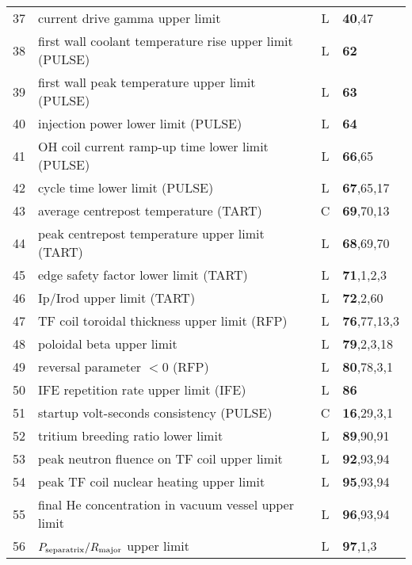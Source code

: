 \documentclass[11pt,a4paper]{report}
\begin{document}
\begin{table}[tbph]
\begin{center}
\begin{tabular}{||c|l|c|l||}
37  & current drive gamma upper limit                           & L    & \textbf{40},47 \\
38  & first wall coolant temperature rise upper limit (PULSE)   & L    & \textbf{62} \\
39  & first wall peak temperature upper limit (PULSE)           & L    & \textbf{63} \\
40  & injection power lower limit (PULSE)                       & L    & \textbf{64} \\
41  & OH coil current ramp-up time lower limit (PULSE)          & L    & \textbf{66},65 \\
42  & cycle time lower limit (PULSE)                            & L    & \textbf{67},65,17 \\
43  & average centrepost temperature (TART)                     & C    & \textbf{69},70,13 \\
44  & peak centrepost temperature upper limit (TART)            & L    & \textbf{68},69,70 \\
45  & edge safety factor lower limit    (TART)                  & L    & \textbf{71},1,2,3 \\
46  & Ip/Irod upper limit               (TART)                  & L    & \textbf{72},2,60 \\
47  & TF coil toroidal thickness upper limit (RFP)              & L    & \textbf{76},77,13,3 \\
48  & poloidal beta upper limit                                 & L    & \textbf{79},2,3,18 \\
49  & reversal parameter $< 0$ (RFP)                            & L    & \textbf{80},78,3,1 \\
50  & IFE repetition rate upper limit (IFE)                     & L    & \textbf{86} \\
51  & startup volt-seconds consistency (PULSE)                  & C    & \textbf{16},29,3,1 \\
52  & tritium breeding ratio lower limit                        & L    & \textbf{89},90,91 \\
53  & peak neutron fluence on TF coil upper limit               & L    & \textbf{92},93,94 \\
54  & peak TF coil nuclear heating upper limit                  & L    & \textbf{95},93,94 \\
55  & final He concentration in vacuum vessel upper limit       & L    & \textbf{96},93,94 \\
56  & $P_{\mbox{\scriptsize separatrix}}/R_{\mbox{\scriptsize major}}$ upper limit & L    & \textbf{97},1,3 \\

\end{tabular}
\end{center}
\end{table}
\end{document}
